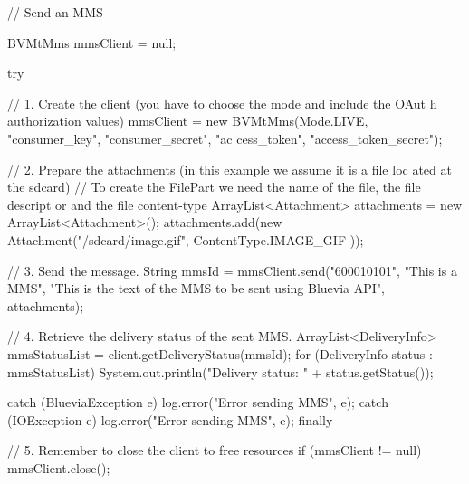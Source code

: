 \begin{DoxyCode}
// Send an MMS
        
BVMtMms mmsClient = null;

try {
        // 1. Create the client (you have to choose the mode and include the OAut
      h authorization values)
        mmsClient = new BVMtMms(Mode.LIVE, "consumer_key", "consumer_secret", "ac
      cess_token", "access_token_secret");


        // 2. Prepare the attachments (in this example we assume it is a file loc
      ated at the sdcard)
        // To create the FilePart we need the name of the file, the file descript
      or and the file content-type
        ArrayList<Attachment> attachments = new ArrayList<Attachment>();
        attachments.add(new Attachment("/sdcard/image.gif", ContentType.IMAGE_GIF
      ));


        // 3. Send the message. 
        String mmsId = mmsClient.send("600010101", "This is a MMS", "This is the 
      text of the MMS to be sent using Bluevia API", attachments);

        // 4. Retrieve the delivery status of the sent MMS.
        ArrayList<DeliveryInfo> mmsStatusList = client.getDeliveryStatus(mmsId);
        for (DeliveryInfo status : mmsStatusList) {
                System.out.println("Delivery status: " + status.getStatus());
        }

} catch (BlueviaException e) {
        log.error("Error sending MMS", e);
} catch (IOException e) {
        log.error("Error sending MMS", e);
} finally {

        // 5. Remember to close the client to free resources
        if (mmsClient != null)
                mmsClient.close();
} 
\end{DoxyCode}
 